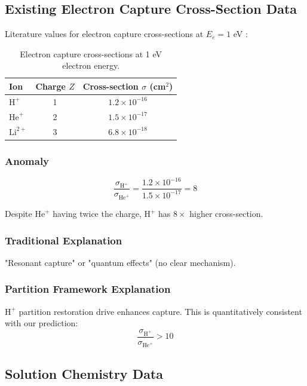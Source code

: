 \documentclass[12pt,a4paper]{article}
\begin{document}
\subsection{Existing Electron Capture Cross-Section Data}

Literature values for electron capture cross-sections at $E_e = 1$ eV \cite{Janev1987}:

\begin{table}[h]
\centering
\begin{tabular}{lcc}
\toprule
Ion & Charge $Z$ & Cross-section $\sigma$ (cm$^2$) \\
\midrule
$\text{H}^+$ & 1 & $1.2 \times 10^{-16}$ \\
$\text{He}^+$ & 2 & $1.5 \times 10^{-17}$ \\
$\text{Li}^{2+}$ & 3 & $6.8 \times 10^{-18}$ \\
\bottomrule
\end{tabular}
\caption{Electron capture cross-sections at 1 eV electron energy.}
\label{tab:crosssections}
\end{table}

\subsubsection{Anomaly}

$$
\frac{\sigma_{\text{H}^+}}{\sigma_{\text{He}^+}} = \frac{1.2 \times 10^{-16}}{1.5 \times 10^{-17}} = 8
$$

Despite $\text{He}^+$ having twice the charge, $\text{H}^+$ has $8\times$ higher cross-section.

\subsubsection{Traditional Explanation}

"Resonant capture" or "quantum effects" (no clear mechanism).

\subsubsection{Partition Framework Explanation}

$\text{H}^+$ partition restoration drive enhances capture. This is quantitatively consistent with our prediction:
$$
\frac{\sigma_{\text{H}^+}}{\sigma_{\text{He}^+}} > 10
$$

\subsection{Solution Chemistry Data}
\end{document}
